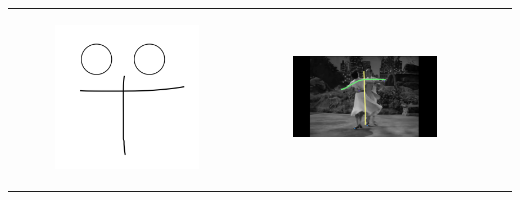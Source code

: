\begin{table}[!htb]
\begin{tabular}{cccc}
\begin{subfigure}{0.2\textwidth}\centering\includegraphics[scale=0.1]{img/03keyframe}\end{subfigure}&
\begin{subfigure}{0.23\textwidth}\centering\includegraphics[scale=0.08]{img/keyframe_case_3_(2)}\end{subfigure}&

\end{tabular}
\end{table}
